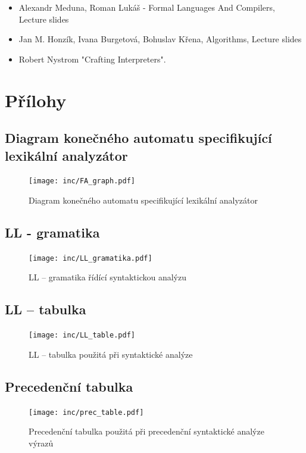 \documentclass[a4paper, 11pt]{article}
\begin{document}
    \begin{itemize}
        \item Alexandr Meduna, Roman Lukáš - Formal Languages And Compilers, Lecture slides
        \item Jan M. Honzík, Ivana Burgetová, Bohuslav Křena, Algorithms, Lecture slides
        \item Robert Nystrom "Crafting Interpreters". 
    \end{itemize}

 
	\clearpage
	
	\renewcommand{\refname}{Literatura}
	



        \section{Přílohy}
	\appendix

	\subsection{Diagram konečného automatu specifikující lexikální analyzátor}
	\begin{figure}[!ht]
		\centering
		\vspace{-1.2cm}
		\texttt{[image: inc/FA\_graph.pdf]}
		\caption{Diagram konečného automatu specifikující lexikální analyzátor}
		\label{figure:fa_graph}
	\end{figure}


	\subsection{LL - gramatika}
	\begin{figure}[!ht]
		\centering
		\vspace{-1.2cm}
		\texttt{[image: inc/LL\_gramatika.pdf]}
		\caption{LL -- gramatika řídící syntaktickou analýzu }
		\label{figure:ll_gramatika}
	\end{figure}


	\subsection{LL -- tabulka}
	\begin{figure}[!ht]
		\centering
		\texttt{[image: inc/LL\_table.pdf]}
		\caption{LL -- tabulka použitá při syntaktické analýze}
		\label{figure:ll_tabulka}
	\end{figure}


	\subsection{Precedenční tabulka}
	\begin{figure}[!ht]
		\centering
		\texttt{[image: inc/prec\_table.pdf]}
		\caption{Precedenční tabulka použitá při precedenční syntaktické analýze výrazů}
		\label{figure:prec_tabulka}
	\end{figure}
\end{document}
